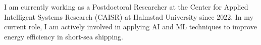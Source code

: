 \documentclass[11pt,letterpaper,sans]{moderncv}   %
\begin{document}


%
%
%
%
%
%
%
%
%
%
%

I am currently working as a Postdoctoral Researcher at the Center for Applied Intelligent Systems Research (CAISR) at Halmstad University since 2022. In my current role, I am actively involved in applying AI and ML techniques to improve energy efficiency in short-sea shipping.\\
\end{document}
